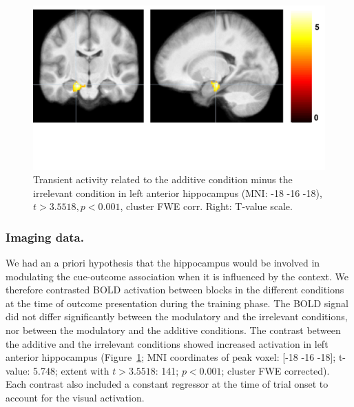 \documentclass[10pt,letterpaper]{article}
\begin{document}
\begin{figure}[ht]
\begin{center}
\includegraphics[scale=0.33,  trim = 0 150 0 0]{additive-irrelevant.pdf}
\end{center}
\caption{Transient activity related to the additive condition minus the irrelevant condition in left anterior hippocampus (MNI: -18 -16 -18), $t > 3.5518, p < 0.001$, cluster FWE corr. Right: T-value scale.} 
\label{additive-irrelevant}
\end{figure}

\subsubsection{Imaging data.} 

We had an a priori hypothesis that the hippocampus would be involved in modulating the cue-outcome association when it is influenced by the context. We therefore contrasted BOLD activation between blocks in the different conditions at the time of outcome presentation during the training phase. The BOLD signal did not differ significantly between the modulatory and the irrelevant conditions, nor between the modulatory and the additive conditions. The contrast between the additive and the irrelevant conditions showed increased activation in left anterior hippocampus (Figure~\ref{additive-irrelevant}; MNI coordinates of peak voxel: [-18 -16 -18]; t-value: 5.748; extent with $t > 3.5518$: 141; $p < 0.001$; cluster FWE corrected). Each contrast also included a constant regressor at the time of trial onset to account for the visual activation.
\end{document}
